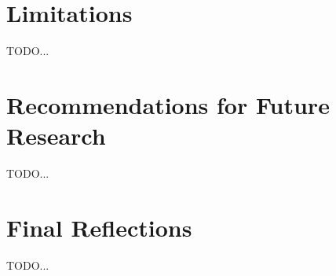 \section{Limitations}
TODO...

\section{Recommendations for Future Research}
TODO...

\section{Final Reflections}
TODO...
